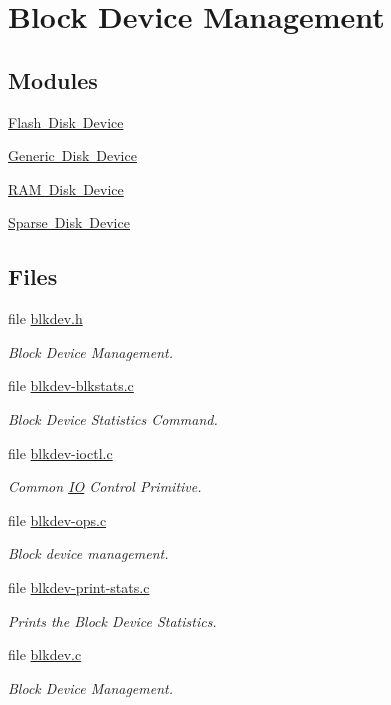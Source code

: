 \hypertarget{group__rtems__blkdev}{}\section{Block Device Management}
\label{group__rtems__blkdev}
\subsection*{Modules}
\begin{DoxyCompactItemize}
\item 
\mbox{\hyperlink{group__RTEMSFDisk}{Flash Disk Device}}
\item 
\mbox{\hyperlink{group__rtems__blkdev__generic}{Generic Disk Device}}
\item 
\mbox{\hyperlink{group__rtems__ramdisk}{R\+A\+M Disk Device}}
\item 
\mbox{\hyperlink{group__rtems__sparse__disk}{Sparse Disk Device}}
\end{DoxyCompactItemize}
\subsection*{Files}
\begin{DoxyCompactItemize}
\item 
file \mbox{\hyperlink{blkdev_8h}{blkdev.\+h}}
\begin{DoxyCompactList}\small\item\em Block Device Management. \end{DoxyCompactList}\item 
file \mbox{\hyperlink{blkdev-blkstats_8c}{blkdev-\/blkstats.\+c}}
\begin{DoxyCompactList}\small\item\em Block Device Statistics Command. \end{DoxyCompactList}\item 
file \mbox{\hyperlink{blkdev-ioctl_8c}{blkdev-\/ioctl.\+c}}
\begin{DoxyCompactList}\small\item\em Common \mbox{\hyperlink{structIO}{IO}} Control Primitive. \end{DoxyCompactList}\item 
file \mbox{\hyperlink{blkdev-ops_8c}{blkdev-\/ops.\+c}}
\begin{DoxyCompactList}\small\item\em Block device management. \end{DoxyCompactList}\item 
file \mbox{\hyperlink{blkdev-print-stats_8c}{blkdev-\/print-\/stats.\+c}}
\begin{DoxyCompactList}\small\item\em Prints the Block Device Statistics. \end{DoxyCompactList}\item 
file \mbox{\hyperlink{blkdev_8c}{blkdev.\+c}}
\begin{DoxyCompactList}\small\item\em Block Device Management. \end{DoxyCompactList}\end{DoxyCompactItemize}
